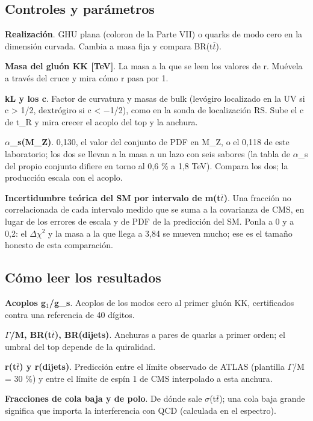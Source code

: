 \documentclass[11pt,a4paper]{article}
\begin{document}
\subsection*{Controles y parámetros}
\textbf{Realización}. GHU plana (coloron de la Parte VII) o quarks de modo cero en la dimensión curvada. Cambia a masa fija y compara BR(t\ensuremath{\overline{t}}).

\textbf{Masa del gluón KK [TeV]}. La masa a la que se leen los valores de r. Muévela a través del cruce y mira cómo r pasa por 1.

\textbf{kL y los c}. Factor de curvatura y masas de bulk (levógiro localizado en la UV si c > 1/2, dextrógiro si c < \ensuremath{-}1/2), como en la sonda de localización RS. Sube el c de t\_R y mira crecer el acoplo del top y la anchura.

\textbf{\ensuremath{\alpha}\_s(M\_Z)}. 0,130, el valor del conjunto de PDF en M\_Z, o el 0,118 de este laboratorio; los dos se llevan a la masa a un lazo con seis sabores (la tabla de \ensuremath{\alpha}\_s del propio conjunto difiere en torno al 0,6 \% a 1,8 TeV). Compara los dos; la producción escala con el acoplo.

\textbf{Incertidumbre teórica del SM por intervalo de m(t\ensuremath{\overline{t}})}. Una fracción no correlacionada de cada intervalo medido que se suma a la covarianza de CMS, en lugar de los errores de escala y de PDF de la predicción del SM. Ponla a 0 y a 0,2: el \ensuremath{\Delta}\ensuremath{\chi}\ensuremath{{}^{2}} y la masa a la que llega a 3,84 se mueven mucho; ese es el tamaño honesto de esta comparación.

\subsection*{Cómo leer los resultados}
\textbf{Acoplos g\ensuremath{{}_{1}}/g\_s}. Acoplos de los modos cero al primer gluón KK, certificados contra una referencia de 40 dígitos.

\textbf{\ensuremath{\Gamma}/M, BR(t\ensuremath{\overline{t}}), BR(dijets)}. Anchuras a pares de quarks a primer orden; el umbral del top depende de la quiralidad.

\textbf{r(t\ensuremath{\overline{t}}) y r(dijets)}. Predicción entre el límite observado de ATLAS (plantilla \ensuremath{\Gamma}/M = 30 \%) y entre el límite de espín 1 de CMS interpolado a esta anchura.

\textbf{Fracciones de cola baja y de polo}. De dónde sale \ensuremath{\sigma}(t\ensuremath{\overline{t}}); una cola baja grande significa que importa la interferencia con QCD (calculada en el espectro).
\end{document}
